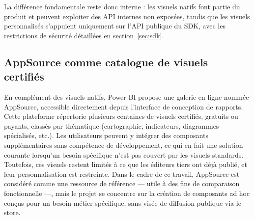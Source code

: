 La différence fondamentale reste donc interne : les visuels natifs font partie du produit et peuvent exploiter des API internes non exposées, tandis que les visuels personnalisés s’appuient uniquement sur l’API publique du SDK, avec les restrictions de sécurité détaillées en section~\ref{sec:sdk}.

\subsection{AppSource comme catalogue de visuels certifiés}
\label{subsec:appsource}

En complément des visuels natifs, Power BI propose une galerie en ligne nommée AppSource, accessible directement depuis l’interface de conception de rapports.  
Cette plateforme répertorie plusieurs centaines de visuels certifiés, gratuits ou payants, classés par thématique (cartographie, indicateurs, diagrammes spécialisés, etc.).  
Les utilisateurs peuvent y intégrer des composants supplémentaires sans compétence de développement, ce qui en fait une solution courante lorsqu’un besoin spécifique n’est pas couvert par les visuels standards.  
Toutefois, ces visuels restent limités à ce que les éditeurs tiers ont déjà publié, et leur personnalisation est restreinte.  
Dans le cadre de ce travail, AppSource est considéré comme une ressource de référence — utile à des fins de comparaison fonctionnelle —, mais le projet se concentre sur la création de composants ad hoc conçus pour un besoin métier spécifique, sans visée de diffusion publique via le store.
